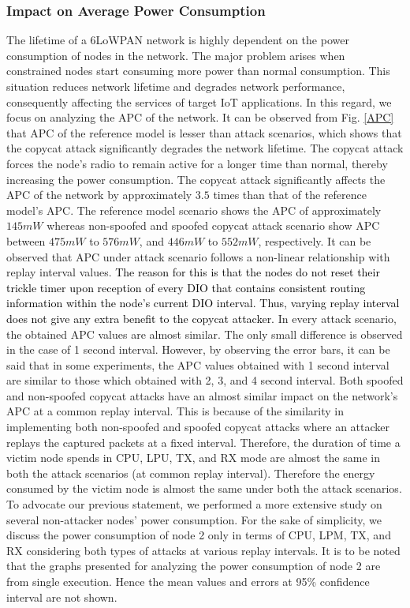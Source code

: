\documentclass[]{svjour3}                     %
\begin{document}
\subsubsection{Impact on Average Power Consumption}
The lifetime of a 6LoWPAN network is highly dependent on the power consumption of nodes in the network. The major problem arises when constrained nodes start consuming more power than normal consumption. This situation reduces network lifetime and degrades network performance, consequently affecting the services of target IoT applications. In this regard, we focus on analyzing the APC of the network. It can be observed from Fig. \ref{APC} that APC of the reference model is lesser than attack scenarios, which shows that the copycat attack significantly degrades the network lifetime. The copycat attack forces the node's radio to remain active for a longer time than normal, thereby increasing the power consumption. The copycat attack significantly affects the APC of the network by approximately $ 3.5 $ times than that of the reference model's APC. The reference model scenario shows the APC of approximately $ 145mW $ whereas non-spoofed and spoofed copycat attack scenario show APC between $ 475mW $ to $ 576mW $, and $ 446mW $ to $ 552mW $, respectively. It can be observed that APC under attack scenario follows a non-linear relationship with replay interval values. \textcolor{black}{The reason for this is that the nodes do not reset their trickle timer upon reception of every DIO that contains consistent routing information within the node's current DIO interval. Thus, varying replay interval does not give any extra benefit to the copycat attacker.} In every attack scenario, the obtained APC values are almost similar. The only small difference is observed in the case of 1 second interval. However, by observing the error bars, it can be said that in some experiments, the APC values obtained with 1 second interval are similar to those which obtained with 2, 3, and 4 second interval. Both spoofed and non-spoofed copycat attacks have an almost similar impact on the network's APC at a common replay interval. This is because of the similarity in implementing both non-spoofed and spoofed copycat attacks where an attacker replays the captured packets at a fixed interval. Therefore, the duration of time a victim node spends in CPU, LPU, TX, and RX mode are almost the same in both the attack scenarios (at common replay interval). Therefore the energy consumed by the victim node is almost the same under both the attack scenarios. To advocate our previous statement, we performed a more extensive study on several non-attacker nodes' power consumption. For the sake of simplicity, we discuss the power consumption of node 2 only in terms of CPU, LPM, TX, and RX considering both types of attacks at various replay intervals. It is to be noted that the graphs presented for analyzing the power consumption of node 2 are from single execution. Hence the mean values and errors at 95\% confidence interval are not shown.  
\end{document}
